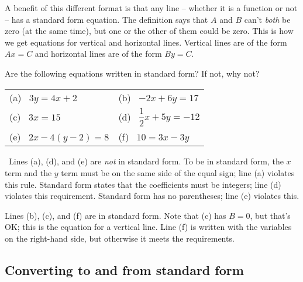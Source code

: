 A benefit of this different format is that any line -- whether it is a function or not -- has a standard form equation. The definition says that $A$ and $B$ can't \textit{both} be zero (at the same time), but one or the other of them could be zero. This is how we get equations for vertical and horizontal lines. Vertical lines are of the form $Ax = C$ and horizontal lines are of the form $By = C$.



\begin{boxex}
Are the following equations written in standard form? If not, why not?

\begin{center}
\begin{tabularx}{0.8\linewidth}{XX}
(a)~ $3y=4x+2$
&
(b)~ $-2x+6y=17$
\\[3ex]
(c)~ $3x=15$
&
(d)~ $\dfrac{1}{2}x+5y=-12$
\\[3ex]
(e)~ $2x -4(y-2)=8$
&
(f)~ $10 = 3x-3y$
\end{tabularx}
\end{center}

\exsoln\ Lines (a), (d), and (e) are \textit{not} in standard form. To be in standard form, the $x$ term and the $y$ term must be on the same side of the equal sign; line (a) violates this rule. Standard form states that the coefficients must be integers; line (d) violates this requirement. Standard form has no parentheses; line (e) violates this.

Lines (b), (c), and (f) are in standard form. Note that (c) has $B=0$, but that's OK; this is the equation for a vertical line. Line (f) is written with the variables on the right-hand side, but otherwise it meets the requirements.
\end{boxex}

\subsection{Converting to and from standard form}

